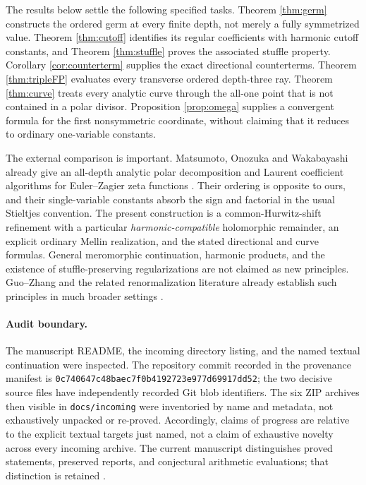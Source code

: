 \documentclass[11pt,a4paper]{article}
\numberwithin{equation}{section}
\theoremstyle{definition}\newtheorem{definition}[theorem]{Definition}
\theoremstyle{remark}\newtheorem{remark}[theorem]{Remark}
\newcommand{\src}[1]{{\small\nolinkurl{#1}}}
\begin{document}
The results below settle the following specified tasks. Theorem
\ref{thm:germ} constructs the ordered germ at every finite depth, not merely
a fully symmetrized value. Theorem \ref{thm:cutoff} identifies its regular
coefficients with harmonic cutoff constants, and Theorem
\ref{thm:stuffle} proves the associated stuffle property. Corollary
\ref{cor:counterterm} supplies the exact directional counterterms. Theorem
\ref{thm:tripleFP} evaluates every transverse ordered depth-three ray.
Theorem \ref{thm:curve} treats every analytic curve through the all-one
point that is not contained in a polar divisor. Proposition
\ref{prop:omega} supplies a convergent formula for the first nonsymmetric
coordinate, without claiming that it reduces to ordinary one-variable
constants.

The external comparison is important. Matsumoto, Onozuka and Wakabayashi
already give an all-depth analytic polar decomposition and Laurent
coefficient algorithms for Euler--Zagier zeta functions \cite{mow}.
Their ordering is opposite to ours, and their single-variable constants
absorb the sign and factorial in the usual Stieltjes convention. The
present construction is a common-Hurwitz-shift refinement with a particular
\emph{harmonic-compatible} holomorphic remainder, an explicit ordinary
Mellin realization, and the stated directional and curve formulas.
General meromorphic continuation, harmonic products, and the existence of
stuffle-preserving regularizations are not claimed as new principles.
Guo--Zhang and the related renormalization literature already establish
such principles in much broader settings \cite{gz,gpxz}.

\paragraph{Audit boundary.}
The manuscript README, the incoming directory listing, and the named
textual continuation were inspected. The repository commit recorded in the
provenance manifest is
\src{0c740647c48baec7f0b4192723e977d69917dd52}; the two decisive source
files have independently recorded Git blob identifiers. The six ZIP
archives then visible in \src{docs/incoming} were inventoried by name and
metadata, not exhaustively unpacked or re-proved. Accordingly, claims of
progress are relative to the explicit textual targets just named, not a
claim of exhaustive novelty across every incoming archive. The current
manuscript distinguishes proved statements, preserved reports, and
conjectural arithmetic evaluations; that distinction is retained
\cite{repo-readme,repo-incoming}.
\end{document}

